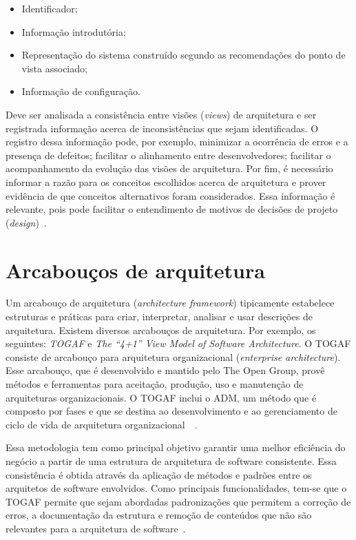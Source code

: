 \begin{itemize}
    \item Identificador;
    \item Informação introdutória;
    \item Representação do sistema construído segundo as recomendações do ponto de vista associado;
    \item Informação de configuração.
\end{itemize}

Deve ser analisada a consistência entre visões (\emph{views}) de arquitetura e ser registrada informação acerca de inconsistências que sejam identificadas. O registro dessa informação pode, por exemplo, minimizar a ocorrência de erros e a presença de defeitos; facilitar o alinhamento entre desenvolvedores; facilitar o acompanhamento da evolução das visões de arquitetura. Por fim, é necessário informar a razão para os conceitos escolhidos acerca de arquitetura e prover evidência de que conceitos alternativos foram considerados. Essa informação é relevante, pois pode facilitar o entendimento de motivos de decisões de projeto (\emph{design})~\cite{ISO_1471}.

\section{Arcabouços de arquitetura}

Um arcabouço de arquitetura (\emph{architecture framework}) tipicamente estabelece estruturas e práticas para criar, interpretar, analisar e usar descrições de arquitetura. Existem diversos arcabouços de arquitetura. Por exemplo, os seguintes: \emph{\acrfull{TOGAF}} e \emph{The “4+1” View Model of Software Architecture}. O TOGAF consiste de arcabouço para arquitetura organizacional (\emph{enterprise architecture}). Esse arcabouço, que é desenvolvido e mantido pelo The Open Group, provê métodos e ferramentas para aceitação, produção, uso e manutenção de arquiteturas organizacionais. O TOGAF inclui o \acrfull{ADM}, um método que é composto por fases e que se destina ao desenvolvimento e ao gerenciamento de ciclo de vida de arquitetura organizacional~\cite{ISO_42010}~\cite{Togaf}. 

Essa metodologia tem como principal objetivo garantir uma melhor eficiência do negócio a partir de uma estrutura de arquitetura de software consistente. Essa consistência é obtida através da aplicação de métodos e padrões entre os arquitetos de software envolvidos. Como principais funcionalidades, tem-se que o \acrfull{TOGAF} permite que sejam abordadas padronizações que permitem a correção de erros, a documentação da estrutura e remoção de conteúdos que não são relevantes para a arquitetura de software~\cite{Togaf}.

